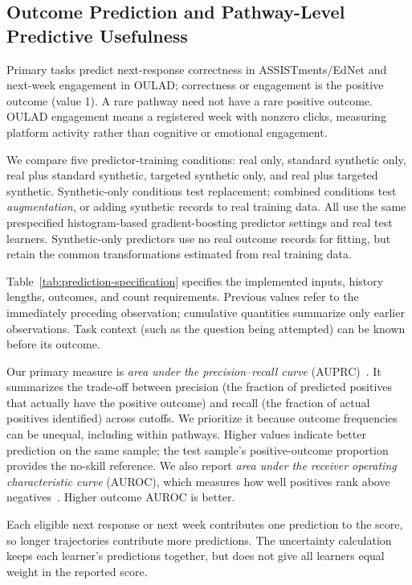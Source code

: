 \documentclass[fleqn,10pt]{JLA_article}
\begin{document}
\subsection{Outcome Prediction and Pathway-Level Predictive Usefulness}
\label{sec:outcome-prediction}

Primary tasks predict next-response correctness in ASSISTments/EdNet and next-week engagement in OULAD; correctness or engagement is the positive outcome (value 1). A rare pathway need not have a rare positive outcome. OULAD engagement means a registered week with nonzero clicks, measuring platform activity rather than cognitive or emotional engagement.

We compare five predictor-training conditions: real only, standard synthetic only, real plus standard synthetic, targeted synthetic only, and real plus targeted synthetic. Synthetic-only conditions test replacement; combined conditions test \emph{augmentation}, or adding synthetic records to real training data. All use the same prespecified histogram-based gradient-boosting predictor settings and real test learners. Synthetic-only predictors use no real outcome records for fitting, but retain the common transformations estimated from real training data.

Table~\ref{tab:prediction-specification} specifies the implemented inputs, history lengths, outcomes, and count requirements. Previous values refer to the immediately preceding observation; cumulative quantities summarize only earlier observations. Task context (such as the question being attempted) can be known before its outcome.



Our primary measure is \emph{area under the precision--recall curve} (AUPRC)~\cite{davis2006precision,saito2015precision}. It summarizes the trade-off between precision (the fraction of predicted positives that actually have the positive outcome) and recall (the fraction of actual positives identified) across cutoffs. We prioritize it because outcome frequencies can be unequal, including within pathways. Higher values indicate better prediction on the same sample; the test sample's positive-outcome proportion provides the no-skill reference. We also report \emph{area under the receiver operating characteristic curve} (AUROC), which measures how well positives rank above negatives~\cite{fawcett2006roc}. Higher outcome AUROC is better.

Each eligible next response or next week contributes one prediction to the score, so longer trajectories contribute more predictions. The uncertainty calculation keeps each learner's predictions together, but does not give all learners equal weight in the reported score.
\end{document}
